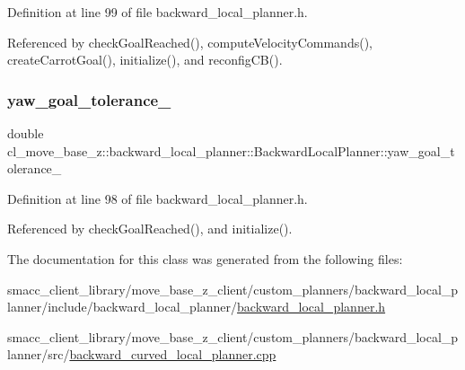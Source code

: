Definition at line 99 of file backward\+\_\+local\+\_\+planner.\+h.



Referenced by check\+Goal\+Reached(), compute\+Velocity\+Commands(), create\+Carrot\+Goal(), initialize(), and reconfig\+C\+B().

\mbox{\label{classcl__move__base__z_1_1backward__local__planner_1_1BackwardLocalPlanner_a9c5104d328041fcde5a3c02664abad48}} 
\subsubsection{\texorpdfstring{yaw\+\_\+goal\+\_\+tolerance\+\_\+}{yaw\_goal\_tolerance\_}}
{\footnotesize\ttfamily double cl\+\_\+move\+\_\+base\+\_\+z\+::backward\+\_\+local\+\_\+planner\+::\+Backward\+Local\+Planner\+::yaw\+\_\+goal\+\_\+tolerance\+\_\+\hspace{0.3cm}{\ttfamily [private]}}



Definition at line 98 of file backward\+\_\+local\+\_\+planner.\+h.



Referenced by check\+Goal\+Reached(), and initialize().



The documentation for this class was generated from the following files\+:\begin{DoxyCompactItemize}
\item 
smacc\+\_\+client\+\_\+library/move\+\_\+base\+\_\+z\+\_\+client/custom\+\_\+planners/backward\+\_\+local\+\_\+planner/include/backward\+\_\+local\+\_\+planner/\hyperlink{backward__local__planner_8h}{backward\+\_\+local\+\_\+planner.\+h}\item 
smacc\+\_\+client\+\_\+library/move\+\_\+base\+\_\+z\+\_\+client/custom\+\_\+planners/backward\+\_\+local\+\_\+planner/src/\hyperlink{backward__curved__local__planner_8cpp}{backward\+\_\+curved\+\_\+local\+\_\+planner.\+cpp}\end{DoxyCompactItemize}
